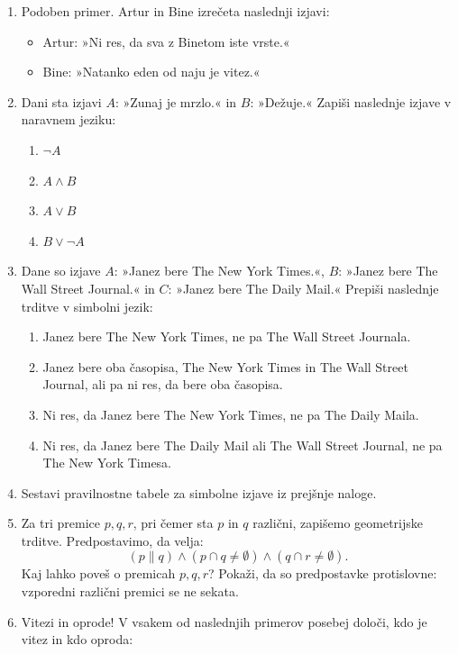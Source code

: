 \documentclass[11pt,paper=b5,DIV=13,headinclude,footinclude]{scrbook}
\begin{document}
\begin{enumerate}
\item {\color{blue}Podoben primer. Artur in Bine izrečeta naslednji izjavi:}
\begin{itemize}
 \item {\color{blue}Artur: »Ni res, da sva z Binetom iste vrste.«}
 \item {\color{blue}Bine: »Natanko eden od naju je vitez.«}
\end{itemize}
\item {\color{blue}Dani sta izjavi $A$: »Zunaj je mrzlo.« in $B$: »Dežuje.«
Zapiši naslednje izjave v naravnem jeziku:}
\begin{enumerate}
\item {\color{blue}$\neg A$}
\item {\color{blue}$A\wedge B$}
\item {\color{blue}$A\vee B$}
\item {\color{blue}$B\vee\neg A$}
\end{enumerate}
\item {\color{blue}Dane so izjave $A$: »Janez bere The New York Times.«,
$B$: »Janez bere The Wall Street Journal.« in $C$: »Janez bere The Daily
Mail.« Prepiši naslednje trditve v simbolni jezik:}
\begin{enumerate}
\item {\color{blue}Janez bere The New York Times, ne pa The Wall Street Journala.}
\item {\color{blue}Janez bere oba časopisa, The New York Times in The Wall Street Journal, ali pa ni res, da bere oba časopisa.}
\item {\color{blue}Ni res, da Janez bere The New York Times, ne pa The Daily Maila.}
\item {\color{blue}Ni res, da Janez bere The Daily Mail ali The Wall Street Journal, ne pa The New York Timesa.}
\end{enumerate}
\item {\color{blue}Sestavi pravilnostne tabele za simbolne izjave iz prejšnje
naloge.}
\item {\color{blue}Za tri premice $p,q,r$, pri čemer sta $p$ in $q$ različni,
zapišemo geometrijske trditve. Predpostavimo, da velja:
\[
(p\parallel q)\land(p\cap q\neq\emptyset)\land(q\cap r\neq\emptyset).
\]
Kaj lahko poveš o premicah $p,q,r$? Pokaži, da so predpostavke protislovne:
vzporedni različni premici se ne sekata.}
\item {\color{blue}Vitezi in oprode! V vsakem od naslednjih primerov posebej
določi, kdo je vitez in kdo oproda:}
\begin{enumerate}

\end{enumerate}
\end{enumerate}
\end{document}
